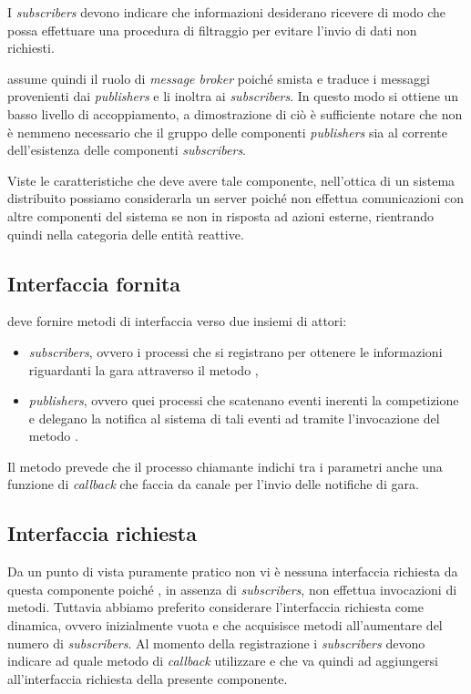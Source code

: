 I \textit{subscribers} devono indicare che informazioni desiderano ricevere di modo che \evdisp{} possa effettuare una procedura di filtraggio per evitare l'invio di dati non richiesti.

\evdisp{} assume quindi il ruolo di \textit{message broker} poiché smista e traduce i messaggi provenienti dai \textit{publishers} e li inoltra ai \textit{subscribers}. In questo modo si ottiene un basso livello di accoppiamento, a dimostrazione di ciò è sufficiente notare che non è nemmeno necessario che il gruppo delle componenti \textit{publishers} sia al corrente dell'esistenza delle componenti \textit{subscribers}.

Viste le caratteristiche che deve avere tale componente, nell'ottica di un sistema distribuito possiamo considerarla un server poiché non effettua comunicazioni con altre componenti del sistema se non in risposta ad azioni esterne, rientrando quindi nella categoria delle entità reattive.

\subsection*{Interfaccia fornita}
\evdisp{} deve fornire metodi di interfaccia verso due insiemi di attori:
\begin{itemize}
\item \textit{subscribers}, ovvero i processi che si registrano per ottenere le informazioni riguardanti la gara attraverso il metodo ,
\item \textit{publishers}, ovvero quei processi che scatenano eventi inerenti la competizione e delegano la notifica al sistema di tali eventi ad \evdisp{} tramite l'invocazione del metodo .
\end{itemize}
Il metodo  prevede che il processo chiamante indichi tra i parametri anche una funzione di \textit{callback} che faccia da canale per l'invio delle notifiche di gara.

\subsection*{Interfaccia richiesta}
Da un punto di vista puramente pratico non vi è nessuna interfaccia richiesta da questa componente poiché \evdisp{}, in assenza di \textit{subscribers}, non effettua invocazioni di metodi. Tuttavia abbiamo preferito considerare l'interfaccia richiesta come dinamica, ovvero inizialmente vuota e che acquisisce metodi all'aumentare del numero di \textit{subscribers}. Al momento della registrazione i \textit{subscribers} devono indicare ad \evdisp{} quale metodo di \textit{callback} utilizzare e che va quindi ad aggiungersi all'interfaccia richiesta della presente componente.


